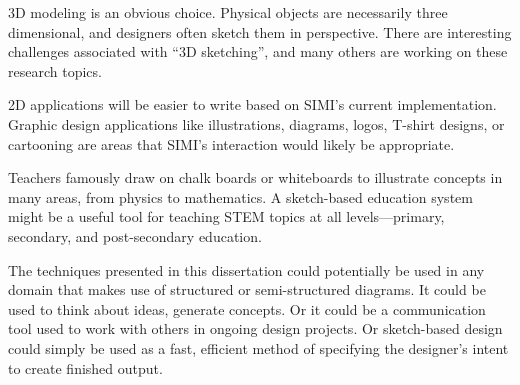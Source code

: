 3D modeling is an obvious choice. Physical objects are necessarily
three dimensional, and designers often sketch them in
perspective. There are interesting challenges associated with ``3D
sketching'', and many others are working on these research topics.

2D applications will be easier to write based on SIMI's current
implementation. Graphic design applications like illustrations,
diagrams, logos, T-shirt designs, or cartooning are areas that SIMI's
interaction would likely be appropriate.

Teachers famously draw on chalk boards or whiteboards to illustrate
concepts in many areas, from physics to mathematics. A sketch-based
education system might be a useful tool for teaching STEM topics at
all levels---primary, secondary, and post-secondary education.

The techniques presented in this dissertation could potentially be used
in any domain that makes use of structured or semi-structured
diagrams. It could be used to think about ideas, generate concepts. Or
it could be a communication tool used to work with others in ongoing
design projects. Or sketch-based design could simply be used as a
fast, efficient method of specifying the designer's intent to create
finished output.


